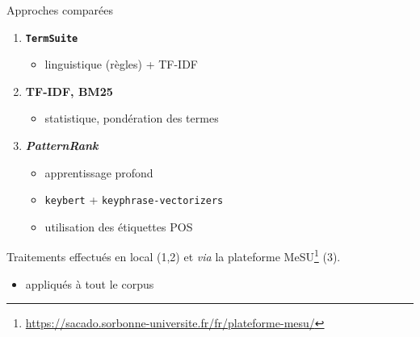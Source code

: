 \begin{frame}{Approches comparées}
	\begin{enumerate}
		\item \textcolor{deepblue}{\textbf{\texttt{TermSuite}}} \hfill {\small\citep{cram2016terminology}}
		\begin{itemize}
			\item linguistique (règles) + \textsc{TF-IDF} 
		\end{itemize} 
		\item \textcolor{deepblue}{\textbf{TF-IDF, BM25}} \hfill {\small\citep{robertson1976relevance}}
		\begin{itemize}
			\item statistique, pondération des termes
		\end{itemize}
		\item \textcolor{deepblue}{\textbf{\textit{PatternRank}}} \hfill {\small \citep{schopf2022}}
		\begin{itemize}
			\item apprentissage profond
			\item \texttt{keybert} + \texttt{keyphrase-vectorizers}
			\item utilisation des étiquettes POS
		\end{itemize} 
	\end{enumerate}
	
	\begin{block}{\vspace*{-0.6mm}}
		Traitements effectués en local (1,2) et \textit{via} la plateforme MeSU\footnote{\url{https://sacado.sorbonne-universite.fr/fr/plateforme-mesu/}} (3).
		\begin{itemize}
			\item appliqués à tout le corpus
		\end{itemize}
	\end{block}
	
\end{frame}